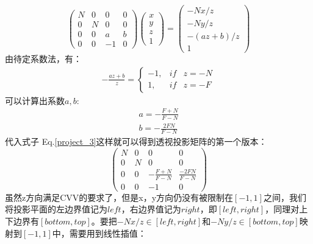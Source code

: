 \begin{spacing}{2.5}
\begin{equation}
		\begin{pmatrix}
		N & 0 & 0 &0 \\ 
		0 & N & 0 &0 \\ 
		0 & 0 & a &b \\ 
		0 & 0 & -1 &0 
	\end{pmatrix}\begin{pmatrix}
	x\\ 
	y\\ 
	z\\ 
	1
	\end{pmatrix}=\begin{pmatrix}
	-Nx/z\\ 
	-Ny/z\\ 
	-(az+b)/z\\ 
	1
	\end{pmatrix}
		\label{project_3}
	\end{equation}
	由待定系数法，有：
	\begin{equation}
		\begin{split}
			-\frac{az+b}{z}=
		\left\{\begin{matrix}
		-1, & if & z = -N\\ 
		1, & if & z = -F
		\end{matrix}\right.
		\end{split}
	\end{equation}
	可以计算出系数$a,b$:
	\begin{equation}
		\begin{split}
			a = -\frac{F+N}{F-N} \\
			b = -\frac{2FN}{F-N}
		\end{split}
	\end{equation}
	代入式子 Eq.\ref{project_3}这样就可以得到透视投影矩阵的第一个版本：
	\begin{equation}
		\begin{pmatrix}
		N & 0 & 0 &0 \\ 
		0 & N & 0 &0 \\ 
		0 & 0 & -\frac{F+N}{F-N} &\frac{-2FN}{F-N} \\ 
		0 & 0 & -1 &0 
	\end{pmatrix}
	\label{project_4}
	\end{equation}
	虽然z方向满足CVV的要求了，但是x，y方向仍没有被限制在$[-1,1]$之间，我们将投影平面的左边界值记为$left$，右边界值记为$right$，即$[left,right]$，同理对上下边界有$[bottom,top]$。要把$-Nx/z\in[left,right]$和$-Ny/z\in[bottom,top]$映射到$[-1,1]$中，需要用到线性插值：
	\begin{equation}
		\begin{split}

\end{split}
\end{equation}
\end{spacing}
